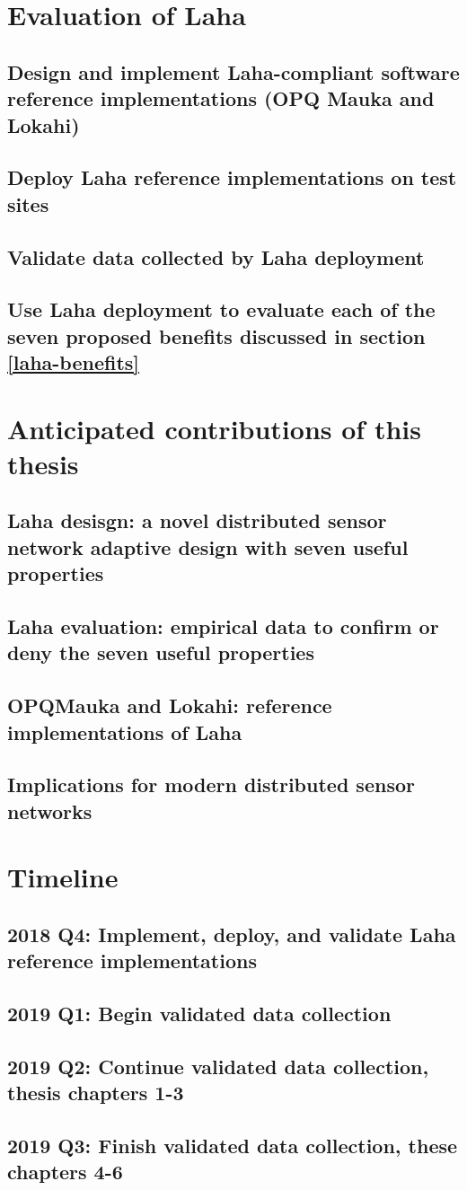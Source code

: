 \section{Evaluation of Laha}
\subsection{Design and implement Laha-compliant software reference implementations (OPQ Mauka and Lokahi)}
\subsection{Deploy Laha reference implementations on test sites}
\subsection{Validate data collected by Laha deployment}
\subsection{Use Laha deployment to evaluate each of the seven proposed benefits discussed in section \ref{laha-benefits}}

\section{Anticipated contributions of this thesis}
\subsection{Laha desisgn: a novel distributed sensor network adaptive design with seven useful properties}
\subsection{Laha evaluation: empirical data to confirm or deny the seven useful properties}
\subsection{OPQMauka and Lokahi: reference implementations of Laha}
\subsection{Implications for modern distributed sensor networks}

\section{Timeline}
\subsection{2018 Q4: Implement, deploy, and validate Laha reference implementations}
\subsection{2019 Q1: Begin validated data collection}
\subsection{2019 Q2: Continue validated data collection, thesis chapters 1-3}
\subsection{2019 Q3: Finish validated data collection, these chapters 4-6}





